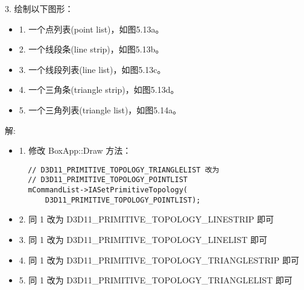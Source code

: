 \begin{flushleft}
3. 绘制以下图形：\\
\begin{itemize}
  \item 1. 一个点列表(point list)，如图5.13a。
  \item 2. 一个线段条(line strip)，如图5.13b。
  \item 3. 一个线段列表(line list)，如图5.13c。
  \item 4. 一个三角条(triangle strip)，如图5.13d。
  \item 5. 一个三角列表(triangle list)，如图5.14a。
\end{itemize}
解: \\
\begin{itemize}
  \item 1. 修改 BoxApp::Draw 方法：\\
  \begin{lstlisting}
  // D3D11_PRIMITIVE_TOPOLOGY_TRIANGLELIST 改为 
  // D3D11_PRIMITIVE_TOPOLOGY_POINTLIST
  mCommandList->IASetPrimitiveTopology(
      D3D11_PRIMITIVE_TOPOLOGY_POINTLIST);
  \end{lstlisting}
  \item 2. 同 1 改为 D3D11\_PRIMITIVE\_TOPOLOGY\_LINESTRIP 即可
  \item 3. 同 1 改为 D3D11\_PRIMITIVE\_TOPOLOGY\_LINELIST 即可
  \item 4. 同 1 改为 D3D11\_PRIMITIVE\_TOPOLOGY\_TRIANGLESTRIP 即可
  \item 5. 同 1 改为 D3D11\_PRIMITIVE\_TOPOLOGY\_TRIANGLELIST 即可
\end{itemize}

\end{flushleft}

